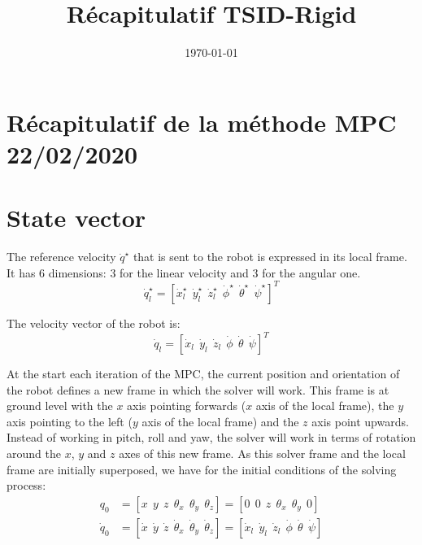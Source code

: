 \documentclass[a4paper,11pt]{article}
\title{Récapitulatif TSID-Rigid}
\author{}
\date{\today}
\newcommand{\PRLsep}{\noindent\makebox[\linewidth]{\resizebox{0.3333\linewidth}{1pt}{$\bullet$}}}%
\begin{document}

\section*{Récapitulatif de la méthode MPC 22/02/2020}

\vspace{0.8cm}
\PRLsep
\vspace{0.5cm}

\section*{State vector}


The reference velocity $\dot q^\star$ that is sent to the robot is expressed in its local frame. It has 6 dimensions: 3 for the linear velocity and 3 for the angular one.
\begin{equation}
\dot q_l^\star = [\dot x_l^\star ~~ \dot y_l^\star ~~ \dot z_l^\star ~~ \dot \phi^\star ~~ \dot \theta^\star ~~ \dot \psi^\star ]^T
\end{equation}

The velocity vector of the robot is:
\begin{equation}
\dot q_l = [\dot x_l ~~ \dot y_l ~~ \dot z_l ~~ \dot \phi ~~ \dot \theta ~~ \dot \psi ]^T
\end{equation}

At the start each iteration of the MPC, the current position and orientation of the robot defines a new frame in which the solver will work. This frame is at ground level with the $x$ axis pointing forwards ($x$ axis of the local frame), the $y$ axis pointing to the left ($y$ axis of the local frame) and the $z$ axis point upwards. Instead of working in pitch, roll and yaw, the solver will work in terms of rotation around the $x$, $y$ and $z$ axes of this new frame. As this solver frame and the local frame are initially superposed, we have for the initial conditions of the solving process:
\begin{align}
q_0 &= [x ~~ y ~~ z ~~ \theta_x ~~ \theta_y ~~ \theta_z ] = [0 ~~ 0 ~~ z ~~ \theta_x ~~ \theta_y ~~ 0] \\
\dot q_0 &= [\dot x ~~ \dot y ~~ \dot z ~~ \dot \theta_x ~~ \dot \theta_y ~~ \dot \theta_z ] = [\dot x_l ~~ \dot y_l ~~ \dot z_l ~~ \dot \phi ~~ \dot \theta ~~ \dot \psi ]
\end{align}
\end{document}

